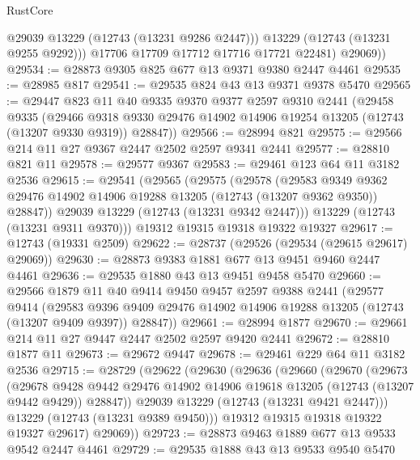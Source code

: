 \begin{lexlean}{RustCore}
\begin{coremodule}
              @29039
              @13229
              (@12743 (@13231 @9286 @2447)))
            @13229
            (@12743 (@13231 @9255 @9292)))
          @17706
          @17709
          @17712
          @17716
          @17721
          @22481)
        @29069))
@29534 := @28873 @9305 @825 @677 @13 @9371 @9380 @2447 @4461
@29535 := @28985 @817
@29541 := @29535 @824 @43 @13 @9371 @9378 @5470
@29565 := @29447
    @823
    @11
    @40
    @9335
    @9370
    @9377
    @2597
    @9310
    @2441
    (@29458
      @9335
      (@29466 @9318 @9330 @29476 @14902 @14906 @19254 @13205 (@12743 (@13207 @9330 @9319)) @28847))
@29566 := @28994 @821
@29575 := @29566 @214 @11 @27 @9367 @2447 @2502 @2597 @9341 @2441
@29577 := @28810 @821 @11
@29578 := @29577 @9367
@29583 := @29461 @123 @64 @11 @3182 @2536
@29615 := @29541
    (@29565
      (@29575
        (@29578
          (@29583
            @9349
            @9362
            @29476
            @14902
            @14906
            @19288
            @13205
            (@12743 (@13207 @9362 @9350))
            @28847))
        @29039
        @13229
        (@12743 (@13231 @9342 @2447)))
      @13229
      (@12743 (@13231 @9311 @9370)))
    @19312
    @19315
    @19318
    @19322
    @19327
@29617 := @12743 (@19331 @2509)
@29622 := @28737 (@29526 (@29534 (@29615 @29617) @29069))
@29630 := @28873 @9383 @1881 @677 @13 @9451 @9460 @2447 @4461
@29636 := @29535 @1880 @43 @13 @9451 @9458 @5470
@29660 := @29566
    @1879
    @11
    @40
    @9414
    @9450
    @9457
    @2597
    @9388
    @2441
    (@29577
      @9414
      (@29583 @9396 @9409 @29476 @14902 @14906 @19288 @13205 (@12743 (@13207 @9409 @9397)) @28847))
@29661 := @28994 @1877
@29670 := @29661 @214 @11 @27 @9447 @2447 @2502 @2597 @9420 @2441
@29672 := @28810 @1877 @11
@29673 := @29672 @9447
@29678 := @29461 @229 @64 @11 @3182 @2536
@29715 := @28729
    (@29622
      (@29630
        (@29636
          (@29660
            (@29670
              (@29673
                (@29678
                  @9428
                  @9442
                  @29476
                  @14902
                  @14906
                  @19618
                  @13205
                  (@12743 (@13207 @9442 @9429))
                  @28847))
              @29039
              @13229
              (@12743 (@13231 @9421 @2447)))
            @13229
            (@12743 (@13231 @9389 @9450)))
          @19312
          @19315
          @19318
          @19322
          @19327
          @29617)
        @29069))
@29723 := @28873 @9463 @1889 @677 @13 @9533 @9542 @2447 @4461
@29729 := @29535 @1888 @43 @13 @9533 @9540 @5470

\end{coremodule}
\end{lexlean}
